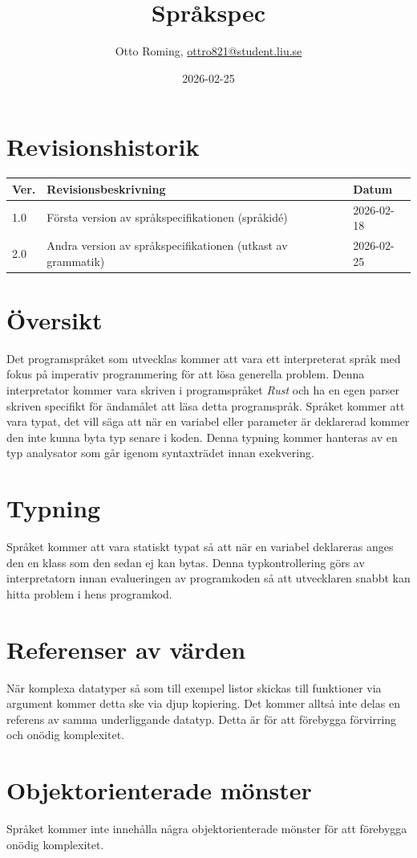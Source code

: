 \documentclass{TDP003mall}
\author{Otto Roming, \url{ottro821@student.liu.se}}
\title{Språkspec}
\date{2026-02-25}
\begin{document}
\projectpage
\section{Revisionshistorik}
\begin{table}[!h]
\begin{tabularx}{\linewidth}{|l|X|l|}
\hline
Ver. & Revisionsbeskrivning & Datum \\\hline
1.0 & Första version av språkspecifikationen (språkidé) & 2026-02-18 \\\hline
2.0 & Andra version av språkspecifikationen (utkast av grammatik) & 2026-02-25 \\\hline
\end{tabularx}
\end{table}

\section{Översikt}
Det programspråket som utvecklas kommer att vara ett interpreterat språk med fokus på imperativ programmering för att lösa generella problem. Denna interpretator kommer vara skriven i programspråket \textit{Rust} och ha en egen parser skriven specifikt för ändamålet att läsa detta programspråk. Språket kommer att vara typat, det vill säga att när en variabel eller parameter är deklarerad kommer den inte kunna byta typ senare i koden.  Denna typning kommer hanteras av en typ analysator som går igenom syntaxträdet innan exekvering.

\section{Typning}
Språket kommer att vara statiskt typat så att när en variabel deklareras anges den en klass som den sedan ej kan bytas. Denna typkontrollering görs av interpretatorn innan evalueringen av programkoden så att utvecklaren snabbt kan hitta problem i hens programkod.

\section{Referenser av värden}
När komplexa datatyper så som till exempel listor skickas till funktioner via argument kommer detta ske via djup kopiering. Det kommer alltså inte delas en referens av samma underliggande datatyp. Detta är för att förebygga förvirring och onödig komplexitet.

\section{Objektorienterade mönster}
Språket kommer inte innehålla några objektorienterade mönster för att förebygga onödig komplexitet.
\end{document}
